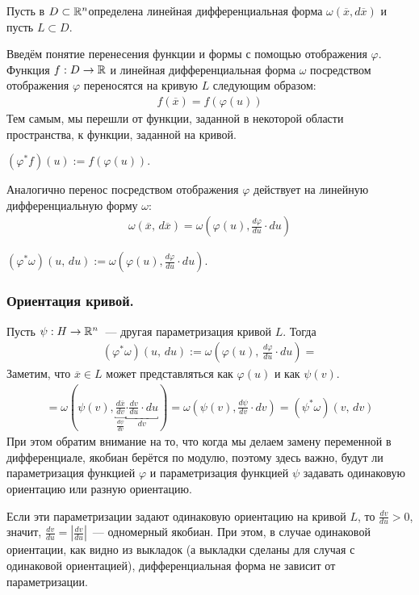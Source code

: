 Пусть в $D \subset \mathbb{R}^n$определена линейная дифференциальная форма $\omega (\overline{x}, d\overline{x})$ и пусть $L \subset D$.

Введём понятие перенесения функции и формы с помощью отображения $\varphi$. Функция $f : D \to \mathbb{R}$ и линейная дифференциальная форма $\omega$ посредством отображения $\varphi$ переносятся на кривую $L$ следующим образом:
\begin{align*}
    f(\overline{x}) = f(\varphi(u))
\end{align*}
Тем самым, мы перешли от функции, заданной в некоторой области пространства, к функции, заданной на кривой.
\begin{designation}
    $(\varphi^* f)(u) := f(\varphi(u)).$ 
\end{designation}
Аналогично перенос посредством отображения $\varphi$ действует на линейную дифференциальную форму $\omega$:
\begin{align*}
    \omega (\overline{x},\, d\overline{x}) = \omega(\varphi(u), \frac{d\varphi}{du} \cdot du)
\end{align*}
\begin{designation}
    $(\varphi^* \omega)(u,\, du) := \omega(\varphi(u), \frac{d\varphi}{du} \cdot du).$ 
\end{designation}

\subsubsection{Ориентация кривой.}
Пусть $\psi: H \to \mathbb{R}^n$~--- другая параметризация кривой $L$. Тогда
\begin{align*}
    (\varphi^* \omega)(u,\, du) := \omega(\varphi(u),\, \frac{d\varphi}{du} \cdot du) =
\end{align*}
Заметим, что $\overline{x} \in L$ может представляться как $\varphi(u)$ и как $\psi(v)$.
\begin{align*}
    = \omega(\psi(v), \underbracket{\frac{d\overline{x}}{dv}}_{\frac{d\psi}{dv}} \underbracket{\cdot \frac{dv}{du} \cdot du}_{dv}) = \omega(\psi(v), \frac{d\psi}{dv} \cdot dv) = (\psi^* \omega)(v,\,dv)
\end{align*}
При этом обратим внимание на то, что когда мы делаем замену переменной в дифференциале, якобиан берётся по модулю, поэтому здесь важно, будут ли параметризация функцией $\varphi$ и параметризация функцией $\psi$ задавать одинаковую ориентацию или разную ориентацию. 

Если эти параметризации задают одинаковую ориентацию на кривой $L$, то $\frac{dv}{du} > 0$, значит, $\frac{dv}{du} = \left\lvert \frac{dv}{du} \right\rvert$~--- одномерный якобиан. При этом, в случае одинаковой ориентации, как видно из выкладок (а выкладки сделаны для случая с одинаковой ориентацией), дифференциальная форма не зависит от параметризации.

